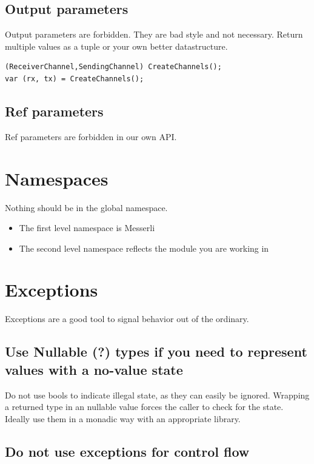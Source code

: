 \documentclass[11pt,a4paper]{article}
\begin{document}
\subsection{Output parameters}

Output parameters are forbidden. They are bad style and not necessary. Return multiple values as a tuple or your own better datastructure.

\begin{lstlisting}[language={[Sharp]C}, caption={Multiple return values}]
(ReceiverChannel,SendingChannel) CreateChannels();
var (rx, tx) = CreateChannels();
\end{lstlisting}

\subsection{Ref parameters}

Ref parameters are forbidden in our own API.

\section{Namespaces}

Nothing should be in the global namespace.

\begin{itemize}[itemsep=0pt]
  \item The first level namespace is Messerli
  \item The second level namespace reflects the module you are working in
\end{itemize}


\section{Exceptions}

Exceptions are a good tool to signal behavior out of the ordinary.

\subsection{Use Nullable (?) types if you need to represent values with a no-value state}

Do not use bools to indicate illegal state, as they can easily be ignored. Wrapping a returned type in an nullable value forces the caller to check for the state. Ideally use them in a monadic way with an appropriate library.

\subsection{Do not use exceptions for control flow}
\end{document}

